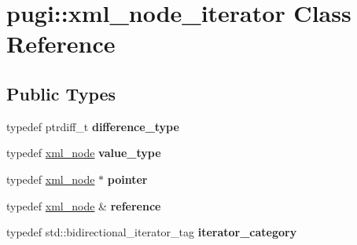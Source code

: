 \hypertarget{classpugi_1_1xml__node__iterator}{}\section{pugi\+:\+:xml\+\_\+node\+\_\+iterator Class Reference}
\label{classpugi_1_1xml__node__iterator}
\subsection*{Public Types}
\begin{DoxyCompactItemize}
\item 
\mbox{\label{classpugi_1_1xml__node__iterator_af493930602ec2f56d27c84d148d692ef}} 
typedef ptrdiff\+\_\+t {\bfseries difference\+\_\+type}
\item 
\mbox{\label{classpugi_1_1xml__node__iterator_a2b0d0c1dd1238c23ef07feeb6069393f}} 
typedef \hyperlink{classpugi_1_1xml__node}{xml\+\_\+node} {\bfseries value\+\_\+type}
\item 
\mbox{\label{classpugi_1_1xml__node__iterator_a8e5476d1f854eb64f92f42dac648acf1}} 
typedef \hyperlink{classpugi_1_1xml__node}{xml\+\_\+node} $\ast$ {\bfseries pointer}
\item 
\mbox{\label{classpugi_1_1xml__node__iterator_ae2efdeb44673427f99b7cc1e726bfa13}} 
typedef \hyperlink{classpugi_1_1xml__node}{xml\+\_\+node} \& {\bfseries reference}
\item 
\mbox{\label{classpugi_1_1xml__node__iterator_ac65c62a919aa8818f0f1204ef0ab24c1}} 
typedef std\+::bidirectional\+\_\+iterator\+\_\+tag {\bfseries iterator\+\_\+category}
\end{DoxyCompactItemize}
